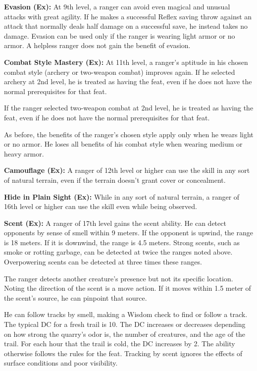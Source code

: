 \textbf{Evasion (Ex):} At 9th level, a ranger can avoid even magical and unusual attacks with great agility. If he makes a successful Reflex saving throw against an attack that normally deals half damage on a successful save, he instead takes no damage. Evasion can be used only if the ranger is wearing light armor or no armor. A helpless ranger does not gain the benefit of evasion.


\textbf{Combat Style Mastery (Ex):} At 11th level, a ranger's aptitude in his chosen combat style (archery or two-weapon combat) improves again. If he selected archery at 2nd level, he is treated as having the  feat, even if he does not have the normal prerequisites for that feat.

If the ranger selected two-weapon combat at 2nd level, he is treated as having the  feat, even if he does not have the normal prerequisites for that feat.

As before, the benefits of the ranger's chosen style apply only when he wears light or no armor. He loses all benefits of his combat style when wearing medium or heavy armor.


\textbf{Camouflage (Ex):} A ranger of 12th level or higher can use the  skill in any sort of natural terrain, even if the terrain doesn't grant cover or concealment.


\textbf{Hide in Plain Sight (Ex):} While in any sort of natural terrain, a ranger of 16th level or higher can use the  skill even while being observed.


\textbf{Scent (Ex):} A ranger of 17th level gains the scent ability. He can detect opponents by sense of smell within 9 meters. If the opponent is upwind, the range is 18 meters. If it is downwind, the range is 4.5 meters. Strong scents, such as smoke or rotting garbage, can be detected at twice the ranges noted above. Overpowering scents can be detected at three times these ranges.

The ranger detects another creature's presence but not its specific location. Noting the direction of the scent is a move action. If it moves within 1.5 meter of the scent's source, he can pinpoint that source.

He can follow tracks by smell, making a Wisdom check to find or follow a track. The typical DC for a fresh trail is 10. The DC increases or decreases depending on how strong the quarry's odor is, the number of creatures, and the age of the trail. For each hour that the trail is cold, the DC increases by 2. The ability otherwise follows the rules for the  feat. Tracking by scent ignores the effects of surface conditions and poor visibility.

